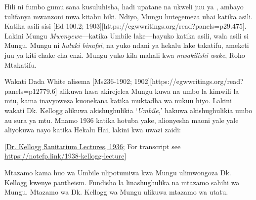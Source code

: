 Hili ni fumbo gumu sana kusuluhisha, hadi upatane na ukweli juu ya , ambayo tulifanya mwanzoni mwa kitabu hiki. Ndiyo, Mungu hutegemeza uhai katika asili. Katika asili sisi [Ed 100.2; 1903][https://egwwritings.org/read?panels=p29.475]. Lakini Mungu \textit{Mwenyewe}—katika Umbile lake—hayuko katika asili, wala asili si Mungu. Mungu ni \textit{huluki binafsi}, na yuko ndani ya hekalu lake takatifu, ameketi juu ya kiti chake cha enzi. Mungu yuko kila mahali kwa \textit{mwakilishi wake}, Roho Mtakatifu.


Wakati Dada White alisema [Ms236-1902; 1902][https://egwwritings.org/read?panels=p12779.6] alikuwa hasa akirejelea Mungu kuwa na umbo la kimwili la mtu, kama inavyoweza kuonekana katika muktadha wa nukuu hiyo. Lakini wakati Dk. Kellogg alikuwa akishughulikia ‘\textit{Umbile},’ hakuwa akishughulikia umbo au sura ya mtu. Mnamo 1936 katika hotuba yake, alionyesha maoni yale yale aliyokuwa nayo katika Hekalu Hai, lakini kwa uwazi zaidi:




[\href{https://forgotten-pillar.s3.us-east-2.amazonaws.com/Sanitarium+Lecture+1936.pdf}{Dr. Kellogg Sanitarium Lectures, 1936}; For transcript see \href{https://notefp.link/1938-kellogg-lecture}{https://notefp.link/1938-kellogg-lecture}]


Mtazamo kama huo wa Umbile ulipotumiwa kwa Mungu ulimwongoza Dk. Kellogg kwenye pantheism. Fundisho la  linashughulika na mtazamo sahihi wa Mungu. Mtazamo wa Dk. Kellogg wa Mungu ulikuwa mtazamo wa utatu.


